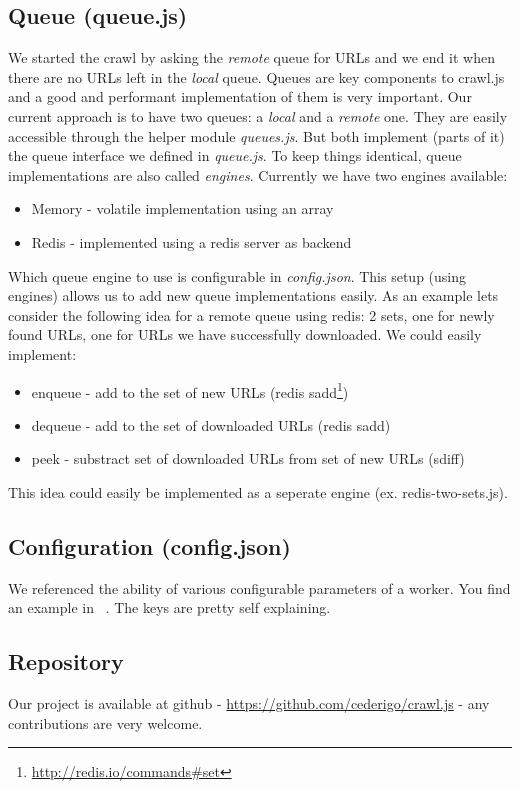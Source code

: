 \subsection{Queue (queue.js)}
We started the crawl by asking the \emph{remote} queue for URLs and we end it when there are no URLs left in the \emph{local} queue. Queues are key components to crawl.js and a good and performant implementation of them is very important. Our current approach is to have two queues: a \emph{local} and a \emph{remote} one. They are easily accessible through the helper module \emph{queues.js}. But both implement (parts of it) the queue interface we defined in \emph{queue.js}. To keep things identical, queue implementations are also called \emph{engines}. Currently we have two engines available:
\begin{itemize}
  \item Memory - volatile implementation using an array
  \item Redis - implemented using a redis server as backend
\end{itemize}
Which queue engine to use is configurable in \emph{config.json}. This setup (using engines) allows us to add new queue implementations easily. As an example lets consider the following idea for a remote queue using redis: 2 sets, one for newly found URLs, one for URLs we have successfully downloaded. We could easily implement:
\begin{itemize}
  \item enqueue - add to the set of new URLs (redis sadd\footnote{\url{http://redis.io/commands\#set}})
  \item dequeue - add to the set of downloaded URLs (redis sadd)
  \item peek - substract set of downloaded URLs from set of new URLs (sdiff)
\end{itemize}
This idea could easily be implemented as a seperate engine (ex. redis-two-sets.js).

\subsection{Configuration (config.json)}
We referenced the ability of various configurable parameters of a worker. You find an example in ~. The keys are pretty self explaining.

\subsection{Repository}
Our project is available at github - \url{https://github.com/cederigo/crawl.js} - any contributions are very welcome.
